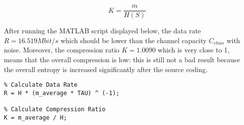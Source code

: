 \begin{equation*}
    K = \frac{\overline{m}}{H(S)}
\end{equation*}

\noindent After running the MATLAB script displayed below, the data rate $R = 16.519 Mbit/s$ which should be lower than the channel capacity $C_{chan}$ with noise. Moreover, the compression ratio $K = 1.0090$ which is very close to 1, means that the overall compression is low: this is still not a bad result because the overall entropy is increased significantly after the source coding.

\begin{lstlisting}
% Calculate Data Rate
R = H * (m_average * TAU) ^ (-1);

% Calculate Compression Ratio
K = m_average / H;
\end{lstlisting}
